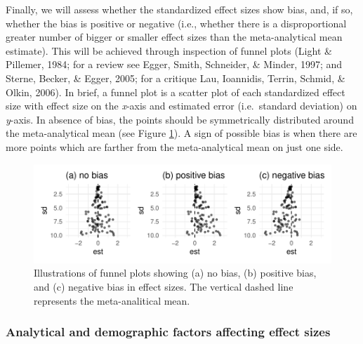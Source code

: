 \documentclass[
  english,
  man,floatsintext]{apa6}
\begin{document}
Finally, we will assess whether the standardized effect sizes show bias, and, if so, whether the bias is positive or negative (i.e., whether there is a disproportional greater number of bigger or smaller effect sizes than the meta-analytical mean estimate).
This will be achieved through inspection of funnel plots (Light \& Pillemer, 1984; for a review see Egger, Smith, Schneider, \& Minder, 1997; and Sterne, Becker, \& Egger, 2005; for a critique Lau, Ioannidis, Terrin, Schmid, \& Olkin, 2006).
In brief, a funnel plot is a scatter plot of each standardized effect size with effect size on the \emph{x}-axis and estimated error (i.e.~standard deviation) on \emph{y}-axis.
In absence of bias, the points should be symmetrically distributed around the meta-analytical mean (see Figure \ref{fig:funnel-plot}).
A sign of possible bias is when there are more points which are farther from the meta-analytical mean on just one side.

\begin{figure}
\centering
\includegraphics{Draft_RR_files/figure-latex/funnel-plot-1.pdf}
\caption{\label{fig:funnel-plot}Illustrations of funnel plots showing (a) no bias, (b) positive bias, and (c) negative bias in effect sizes. The vertical dashed line represents the meta-analitical mean.}
\end{figure}

\hypertarget{ana-factors}{%
\subsubsection{Analytical and demographic factors affecting effect sizes}\label{ana-factors}}
\end{document}
